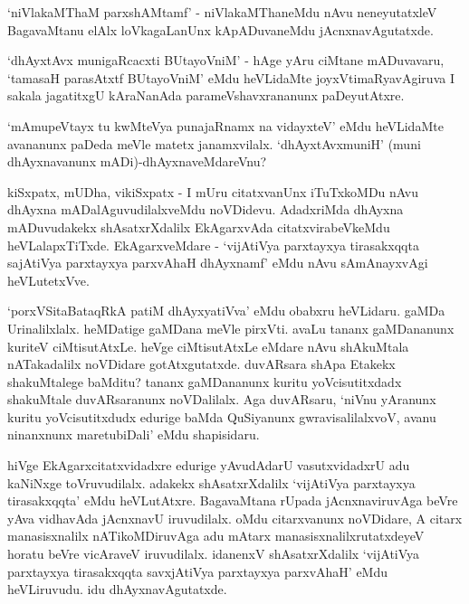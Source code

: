 `niVlakaMThaM parxshAMtamf' - niVlakaMThaneMdu nAvu neneyutatxleV BagavaMtanu elAlx loVkagaLanUnx kApADuvaneMdu jAcnxnavAgutatxde.

`dhAyxtAvx munigaRcacxti BUtayoVniM' - hAge yAru ciMtane mADuvavaru, `tamasaH parasAtxtf BUtayoVniM' eMdu heVLidaMte joyxVtimaRyavAgiruva I sakala jagatitxgU kAraNanAda parameVshavxrananunx paDeyutAtxre.

`mAmupeVtayx tu kwMteVya punajaRnamx na vidayxteV' eMdu heVLidaMte avananunx paDeda meVle matetx janamxvilalx. `dhAyxtAvxmuniH' (muni dhAyxnavanunx mADi)-dhAyxnaveMdareVnu?

kiSxpatx, mUDha, vikiSxpatx - I mUru citatxvanUnx iTuTxkoMDu nAvu dhAyxna mADalAguvudilalxveMdu noVDidevu. AdadxriMda dhAyxna mADuvudakekx shAsatxrXdalilx EkAgarxvAda citatxvirabeVkeMdu heVLalapxTiTxde. EkAgarxveMdare - `vijAtiVya parxtayxya tirasakxqqta sajAtiVya parxtayxya parxvAhaH dhAyxnamf' eMdu nAvu sAmAnayxvAgi heVLutetxVve.

`porxVSitaBataqRkA patiM dhAyxyatiVva' eMdu obabxru heVLidaru. gaMDa Urinalilxlalx. heMDatige gaMDana meVle pirxVti. avaLu tananx gaMDananunx kuriteV ciMtisutAtxLe. heVge ciMtisutAtxLe eMdare nAvu shAkuMtala nATakadalilx noVDidare gotAtxgutatxde. duvARsara shApa Etakekx shakuMtalege baMditu? tananx gaMDananunx kuritu yoVcisutitxdadx shakuMtale duvARsaranunx noVDalilalx. Aga duvARsaru, `niVnu yAranunx kuritu yoVcisutitxdudx edurige baMda QuSiyanunx gwravisalilalxvoV, avanu ninanxnunx maretubiDali' eMdu shapisidaru.

hiVge EkAgarxcitatxvidadxre edurige yAvudAdarU vasutxvidadxrU adu kaNiNxge toVruvudilalx. adakekx shAsatxrXdalilx `vijAtiVya parxtayxya tirasakxqqta' eMdu heVLutAtxre. BagavaMtana rUpada jAcnxnaviruvAga beVre yAva vidhavAda jAcnxnavU iruvudilalx. oMdu citarxvanunx noVDidare, A citarx manasisxnalilx nATikoMDiruvAga adu mAtarx manasisxnalilxrutatxdeyeV horatu beVre vicAraveV iruvudilalx. idanenxV shAsatxrXdalilx `vijAtiVya parxtayxya tirasakxqqta savxjAtiVya parxtayxya parxvAhaH' eMdu heVLiruvudu. idu dhAyxnavAgutatxde.

